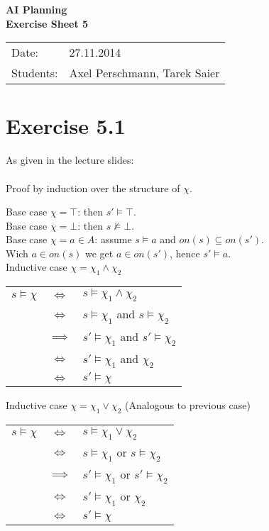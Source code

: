 \documentclass[11pt,a4paper]{article}
\begin{document}
\begin{center}
\Huge{\textbf{AI Planning}}\\
\LARGE{\textbf{Exercise Sheet 5}}
\end{center}
\vspace{2cm}
\begin{tabular}{ll}
Date: & 27.11.2014\\
Students: & Axel Perschmann, Tarek Saier
\end{tabular}

\section*{Exercise 5.1}
As given in the lecture slides:\\
\\
Proof by induction over the structure of $\chi$.

Base case $\chi = \top$: then $s' \models \top$.\\
Base case $\chi = \bot$: then $s \not\models \bot$.\\

Base case $\chi = a \in A$: assume $s \models a$ and $on(s) \subseteq on(s')$. \\
Wich $a \in on(s)$ we get $a \in on(s')$, hence $s' \models a$.\\

Inductive case $\chi = \chi_1 \land \chi_2$

\begin{tabular}{l c l}
$s \models \chi$ & $\iff$ & $s \models \chi_1 \land \chi_2$ \\
 & $\iff$ & $s \models \chi_1$ and $s \models \chi_2$\\
 & $\implies$ & $s' \models \chi_1$ and $s' \models \chi_2$\\
 & $\iff$ & $s' \models \chi_1$ and $\chi_2$ \\
 & $\iff$ & $s' \models \chi$ 
\end{tabular}
 
Inductive case $\chi = \chi_1 \lor \chi_2$ (Analogous to previous case)

\begin{tabular}{l c l}
$s \models \chi$ & $\iff$ & $s \models \chi_1 \lor \chi_2$ \\
 & $\iff$ & $s \models \chi_1$ or $s \models \chi_2$\\
 & $\implies$ & $s' \models \chi_1$ or $s' \models \chi_2$\\
 & $\iff$ & $s' \models \chi_1$ or $\chi_2$ \\
 & $\iff$ & $s' \models \chi$ 
\end{tabular}
\end{document}
